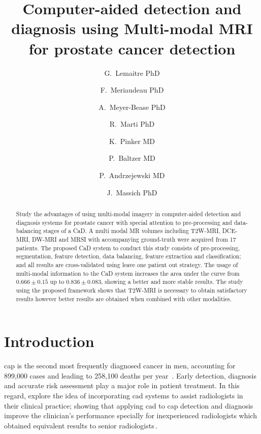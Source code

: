 \documentclass[num-refs]{wiley-article}
\title{Computer-aided detection and diagnosis using Multi-modal MRI for prostate cancer detection}
\author[1\authfn{1}]{G.~Lemaitre PhD}
\author[2\authfn{1}]{F.~Meriaudeau PhD}
\author[2\authfn{1}]{A.~Meyer-Bease PhD}
\author[2\authfn{1}]{R.~Marti PhD}
\author[2\authfn{1}]{K.~Pinker MD}
\author[2\authfn{1}]{P.~Baltzer MD}
\author[2\authfn{1}]{P.~Andrzejewski MD}
\author[1\authfn{1}]{J.~Massich PhD}
\affil[1]{Department, Institution, City, State or Province, Postal Code, Country}
\affil[2]{Department, Institution, City, State or Province, Postal Code, Country}
\begin{document}
\maketitle


\begin{abstract}
    Study the advantages of using multi-modal imagery in computer-aided
    detection and diagnosis systems for prostate cancer with special attention to
    pre-processing and data-balancing stages of a CaD.
%
    A multi modal MR volumes including T2W-MRI, DCE-MRI, DW-MRI and MRSI with
    accompanying ground-truth were acquired from 17 patients. The proposed CaD
    system to conduct this study consists of pre-processing, segmentation, feature
    detection, data balancing, feature extraction and classification;
    and all results are cross-validated using leave one patient out strategy.
%
    The usage of multi-modal information to the CaD system increases the area
    under the curve from $0.666\pm0.15$ up to $0.836\pm0.083$, showing a better
    and more stable results.
%
    The study using the proposed framework shows that T2W-MRI is necessary to
    obtain satisfactory results however better results are obtained when combined
    with other modalities.

\end{abstract}




\section{Introduction}

\Ac{cap} is the second most frequently diagnosed cancer in men, accounting for
899,000 cases and leading to 258,100 deaths per year~\citep{ferlay2010estimates}.
%
Early detection, diagnosis and accurate risk assessment play a major role in
patient treatment. In this regard, \citeauthor*{Hambrock2013} explore the idea
of incorporating \ac{cad} systems to assist radiologists in their clinical
practice; showing that applying \ac{cad} to \ac{cap} detection and diagnosis
improve the clinician's performance specially for inexperienced radiologists
which obtained equivalent results to senior radiologists\,\cite{Hambrock2013}.
\end{document}
